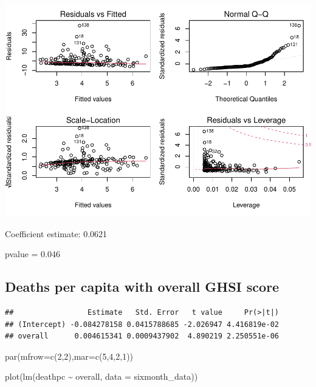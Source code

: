 \documentclass[
]{article}
\newenvironment{Shaded}{\begin{snugshade}}{\end{snugshade}}
\newcommand{\AttributeTok}[1]{\textcolor[rgb]{0.77,0.63,0.00}{#1}}
\newcommand{\DecValTok}[1]{\textcolor[rgb]{0.00,0.00,0.81}{#1}}
\newcommand{\FunctionTok}[1]{\textcolor[rgb]{0.00,0.00,0.00}{#1}}
\newcommand{\NormalTok}[1]{#1}
\newcommand{\SpecialCharTok}[1]{\textcolor[rgb]{0.00,0.00,0.00}{#1}}
\begin{document}
\includegraphics{Basic-Regression_files/figure-latex/unnamed-chunk-1-1.pdf}

Coefficient estimate: 0.0621

pvalue = 0.046

\hypertarget{deaths-per-capita-with-overall-ghsi-score}{%
\subsection{Deaths per capita with overall GHSI
score}\label{deaths-per-capita-with-overall-ghsi-score}}

\begin{Shaded}
\end{Shaded}

\begin{verbatim}
##                 Estimate   Std. Error   t value     Pr(>|t|)
## (Intercept) -0.084278158 0.0415788685 -2.026947 4.416819e-02
## overall      0.004615341 0.0009437902  4.890219 2.250551e-06
\end{verbatim}

\begin{Shaded}
\begin{Highlighting}[]
\FunctionTok{par}\NormalTok{(}\AttributeTok{mfrow=}\FunctionTok{c}\NormalTok{(}\DecValTok{2}\NormalTok{,}\DecValTok{2}\NormalTok{),}\AttributeTok{mar=}\FunctionTok{c}\NormalTok{(}\DecValTok{5}\NormalTok{,}\DecValTok{4}\NormalTok{,}\DecValTok{2}\NormalTok{,}\DecValTok{1}\NormalTok{))}

\FunctionTok{plot}\NormalTok{(}\FunctionTok{lm}\NormalTok{(deathpc }\SpecialCharTok{\textasciitilde{}}\NormalTok{ overall, }\AttributeTok{data =}\NormalTok{ sixmonth\_data))}
\end{Highlighting}
\end{Shaded}
\end{document}
